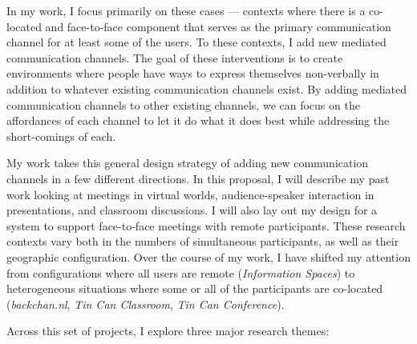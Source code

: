 \documentclass{tufte-handout}
\begin{document}

In my work, I focus primarily on these cases --- contexts where there is a co-located and face-to-face component that serves as the primary communication channel for at least some of the users. To these contexts, I add new mediated communication channels. The goal of these interventions is to create environments where people have ways to express themselves non-verbally in addition to whatever existing communication channels exist. By adding mediated communication channels to other existing channels, we can focus on the affordances of each channel to let it do what it does best while addressing the short-comings of each.


My work takes this general design strategy of adding new communication channels in a few different directions. In this proposal, I will describe my past work looking at meetings in virtual worlds, audience-speaker interaction in presentations, and classroom discussions. I will also lay out my design for a system to support face-to-face meetings with remote participants. These research contexts vary both in the numbers of simultaneous participants, as well as their geographic configuration. Over the course of my work, I have shifted my attention from configurations where all users are remote (\emph{Information Spaces}) to heterogeneous situations where some or all of the participants are co-located (\emph{backchan.nl}, \emph{Tin Can Classroom}, \emph{Tin Can Conference}). 

Across this set of projects, I explore three major research themes:
\end{document}

